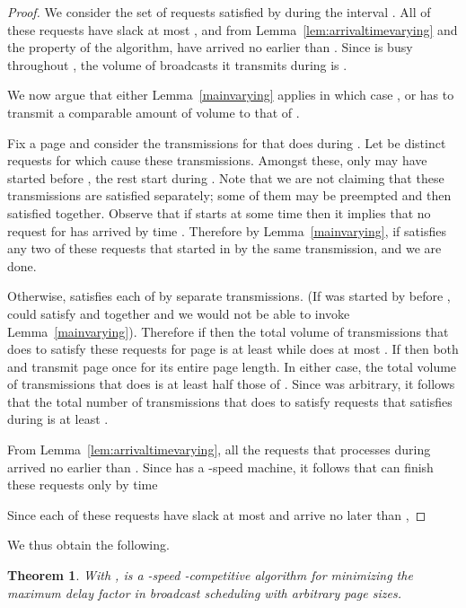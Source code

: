 \documentclass[11pt]{article}
\newtheorem{theorem}[lemma]{Theorem}
\begin{document}
\begin{proof}
  We consider the set of requests satisfied by  during the
  interval . All of these requests have slack at
  most , and from Lemma~\ref{lem:arrivaltimevarying} and
  the property of the algorithm, have arrived no earlier than
  . Since  is busy throughout
  , the volume of broadcasts it transmits during 
  is .

  We now argue that either Lemma~\ref{mainvarying} applies in which
  case , or  has to transmit
  a comparable amount of volume to that of .

  Fix a page  and consider the transmissions for  that 
  does during . Let 
  be distinct requests for  which cause these
  transmissions. Amongst these, only  may have started
  before , the rest start during .  Note that we are not
  claiming that these transmissions are satisfied separately; some of
  them may be preempted and then satisfied together. Observe that if
   starts at some time  then it implies that no
  request  for  has arrived by time .
  Therefore by Lemma~\ref{mainvarying}, if  satisfies any two of
  these requests that  started in  by the same transmission,
   and we are done.

  Otherwise,  satisfies each of  by separate transmissions. (If  was
  started by  before ,  could satisfy 
  and  together and we would not be able to invoke
  Lemma~\ref{mainvarying}). Therefore if  then the total
  volume of transmissions that  does to satisfy these requests
  for page  is at least  while  does at most
  .  If  then both  and  transmit page  once for its entire page length. In either case, the total volume of transmissions
  that  does is at least half those of . Since  was
  arbitrary, it follows that the total number of transmissions that
   does to satisfy requests that  satisfies during 
  is at least .

  From Lemma~\ref{lem:arrivaltimevarying}, all the requests that
   processes during  arrived no earlier than . Since  has a -speed machine,
  it follows that  can finish these requests only by time
  
  Since each of these requests have slack at most  and arrive
  no later than ,


\end{proof}

We thus obtain the following.


\begin{theorem}
  With ,  is a -speed -competitive algorithm for minimizing the maximum delay
  factor in broadcast scheduling with arbitrary page sizes.
\end{theorem}
\end{document}
